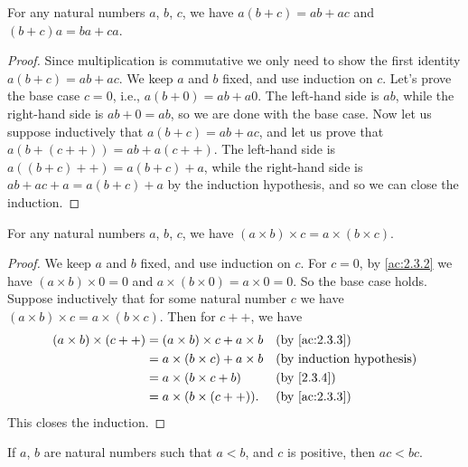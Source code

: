 \begin{prop}\label{2.3.4}
  For any natural numbers \(a\), \(b\), \(c\), we have \(a(b + c) = ab + ac\) and \((b + c)a = ba + ca\).
\end{prop}

\begin{proof}
  Since multiplication is commutative we only need to show the first identity \(a(b + c) = ab + ac\).
  We keep \(a\) and \(b\) fixed, and use induction on \(c\).
  Let's prove the base case \(c = 0\), i.e., \(a(b + 0) = ab + a0\).
  The left-hand side is \(ab\), while the right-hand side is \(ab + 0 = ab\), so we are done with the base case.
  Now let us suppose inductively that \(a(b + c) = ab + ac\), and let us prove that \(a(b + (c++)) = ab + a(c++)\).
  The left-hand side is \(a((b + c)++) = a(b + c) + a\), while the right-hand side is \(ab + ac + a = a(b + c) + a\) by the induction hypothesis, and so we can close the induction.
\end{proof}

\begin{prop}\label{2.3.5}
  For any natural numbers \(a\), \(b\), \(c\), we have \((a \times b) \times c = a \times (b \times c)\).
\end{prop}

\begin{proof}
  We keep \(a\) and \(b\) fixed, and use induction on \(c\).
  For \(c = 0\), by \cref{ac:2.3.2} we have \((a \times b) \times 0 = 0\) and \(a \times (b \times 0) = a \times 0 = 0\).
  So the base case holds.
  Suppose inductively that for some natural number \(c\) we have \((a \times b) \times c = a \times (b \times c)\).
  Then for \(c++\), we have
  \begin{align*}
    (a \times b) \times (c++) & = (a \times b) \times c + a \times b &  & \by{ac:2.3.3} \\
                              & = a \times (b \times c) + a \times b &  & \byIH         \\
                              & = a \times (b \times c + b)          &  & \by{2.3.4}    \\
                              & = a \times (b \times (c++)).         &  & \by{ac:2.3.3}
  \end{align*}
  This closes the induction.
\end{proof}

\begin{prop}\label{2.3.6}
  If \(a\), \(b\) are natural numbers such that \(a < b\), and \(c\) is positive, then \(ac < bc\).
\end{prop}

